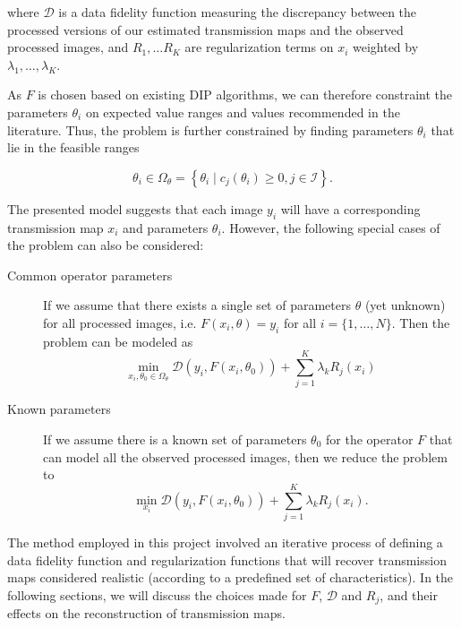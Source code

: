 \documentclass[nomenclature, english, bibtex]{kththesis}
\numberwithin{listing}{chapter}
\begin{document}
where $\mathcal{D}$ is a data fidelity function measuring the discrepancy between the processed versions of
our estimated transmission maps and the observed processed images, and $R_1, \dots R_K$ are regularization
terms on $x_i$ weighted by $\lambda_1, \dots, \lambda_K$.

As $F$ is chosen based on existing \acrshort{DIP} algorithms, we can therefore constraint the parameters $\theta_i$
on expected value ranges and values recommended in the literature. Thus, the problem is further constrained by finding
parameters $\theta_i$ that lie in the feasible ranges

\begin{equation}
    \theta_i \in \Omega_\theta = \left\{ \theta_i \mid c_j(\theta_i) \geq 0, j \in \mathcal{I}  \right\}.
\end{equation}

The presented model suggests that each image $y_i$ will have a corresponding transmission map $x_i$ and
parameters $\theta_i$. However, the following special cases of the problem can also be considered:

\begin{description}
    \item[Common operator parameters] If we assume that there exists a single set of parameters $\theta$
    (yet unknown) for all processed images, i.e. $F(x_i, \theta) = y_i$ for all $i = \{1,\dots,N\}$.
    Then the problem can be modeled as
    \begin{equation}
        \min_{x_i, \theta_0 \in \Omega_\theta}  \mathcal{D}(y_i, F(x_i, \theta_0)) + \sum_{j = 1}^{K} \lambda_k R_j(x_i)
    \end{equation}
    \item[Known parameters] If we assume there is a known set of parameters $\theta_0$ for the operator
    $F$ that can model all the observed processed images, then we reduce the problem to
    \begin{equation}
        \min_{x_i}  \mathcal{D}(y_i, F(x_i, \theta_0)) + \sum_{j = 1}^{K} \lambda_k R_j(x_i).
    \end{equation}
\end{description}


The method employed in this project involved an iterative process of defining a data fidelity function and
regularization functions that will recover transmission maps considered realistic (according to a predefined
set of characteristics). In the following sections, we will discuss the choices made for
$F$, $\mathcal{D}$ and $R_j$, and their effects on the reconstruction of transmission maps.
\end{document}
